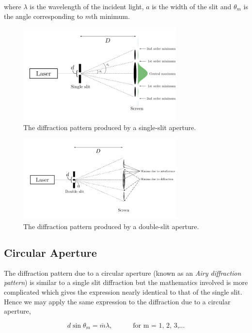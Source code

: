 where $\lambda$ is the wavelength of the incident light, $a$ is the width of the slit and $\theta_m$ is the angle corresponding to $m$th minimum. 

\begin{figure}[!htb]
    \centering
    \includegraphics[width=0.75\textwidth]{figs/singleslit.png}
    \caption{The diffraction pattern produced by a single-slit aperture.}
    \label{fig:singleslit}
\end{figure}

\begin{figure}[!htb]
    \centering
    \includegraphics[width=0.75\textwidth]{figs/doubleslit.png}
    \caption{The diffraction pattern produced by a double-slit aperture.}
    \label{fig:doubleslit}
\end{figure}


\subsection*{Circular Aperture}

The diffraction pattern due to a circular aperture (known as an \textit{Airy diffraction pattern}) is similar to a single slit diffraction but the mathematics involved is more complicated which gives the expression nearly identical to that of the single slit. Hence we may apply the same expression to the diffraction due to a circular aperture, 

\begin{equation*}
    d \sin{\theta_m} = \overline{m} \lambda,  \quad\quad\quad \text{for    m  = 1, 2, 3,}\hdots
\end{equation*}

